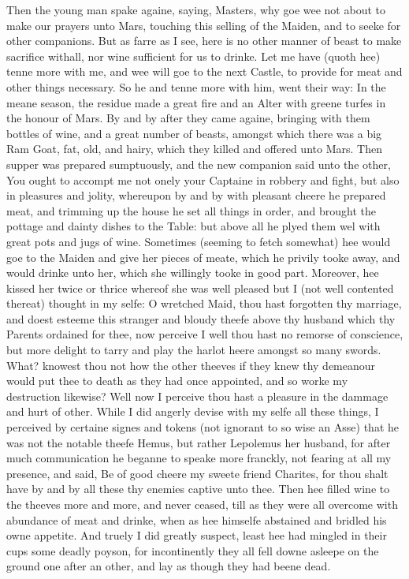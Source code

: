 Then the young man spake againe, saying, Masters, why goe wee not about to make
our prayers unto Mars, touching this selling of the Maiden, and to seeke for
other companions. But as farre as I see, here is no other manner of beast to
make sacrifice withall, nor wine sufficient for us to drinke. Let me have
(quoth hee) tenne more with me, and wee will goe to the next Castle, to provide
for meat and other things necessary. So he and tenne more with him, went their
way: In the meane season, the residue made a great fire and an Alter with
greene turfes in the honour of Mars. By and by after they came againe, bringing
with them bottles of wine, and a great number of beasts, amongst which there
was a big Ram Goat, fat, old, and hairy, which they killed and offered unto
Mars. Then supper was prepared sumptuously, and the new companion said unto the
other, You ought to accompt me not onely your Captaine in robbery and fight,
but also in pleasures and jolity, whereupon by and by with pleasant cheere he
prepared meat, and trimming up the house he set all things in order, and
brought the pottage and dainty dishes to the Table: but above all he plyed them
wel with great pots and jugs of wine. Sometimes (seeming to fetch somewhat) hee
would goe to the Maiden and give her pieces of meate, which he privily tooke
away, and would drinke unto her, which she willingly tooke in good part.
Moreover, hee kissed her twice or thrice whereof she was well pleased but I
(not well contented thereat) thought in my selfe: O wretched Maid, thou hast
forgotten thy marriage, and doest esteeme this stranger and bloudy theefe above
thy husband which thy Parents ordained for thee, now perceive I well thou hast
no remorse of conscience, but more delight to tarry and play the harlot heere
amongst so many swords. What? knowest thou not how the other theeves if they
knew thy demeanour would put thee to death as they had once appointed, and so
worke my destruction likewise? Well now I perceive thou hast a pleasure in the
dammage and hurt of other. While I did angerly devise with my selfe all these
things, I perceived by certaine signes and tokens (not ignorant to so wise an
Asse) that he was not the notable theefe Hemus, but rather Lepolemus her
husband, for after much communication he beganne to speake more franckly, not
fearing at all my presence, and said, Be of good cheere my sweete friend
Charites, for thou shalt have by and by all these thy enemies captive unto
thee. Then hee filled wine to the theeves more and more, and never ceased, till
as they were all overcome with abundance of meat and drinke, when as hee
himselfe abstained and bridled his owne appetite. And truely I did greatly
suspect, least hee had mingled in their cups some deadly poyson, for
incontinently they all fell downe asleepe on the ground one after an other, and
lay as though they had beene dead.

